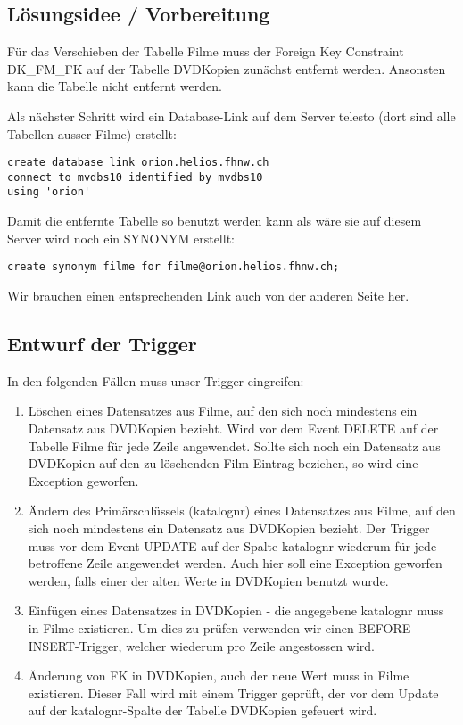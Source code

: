 \documentclass[11pt,a4paper,parskip=half]{scrartcl}
\begin{document}
\subsection{Lösungsidee / Vorbereitung}
Für das Verschieben der Tabelle \glqq{}Filme\grqq{} muss der Foreign Key Constraint \glqq{}DK\_FM\_FK\grqq{} auf der Tabelle \glqq{}DVDKopien\grqq{} zunächst entfernt werden. Ansonsten kann die Tabelle nicht entfernt werden.

Als nächster Schritt wird ein Database-Link auf dem Server telesto (dort sind alle Tabellen ausser Filme) erstellt:

\begin{lstlisting}
create database link orion.helios.fhnw.ch
connect to mvdbs10 identified by mvdbs10
using 'orion'
\end{lstlisting}

Damit die entfernte Tabelle so benutzt werden kann als wäre sie auf diesem Server wird noch ein SYNONYM erstellt:
\begin{lstlisting}
create synonym filme for filme@orion.helios.fhnw.ch;
\end{lstlisting}

Wir brauchen einen entsprechenden Link auch von der anderen Seite her.

\subsection{Entwurf der Trigger}
In den folgenden Fällen muss unser Trigger eingreifen:
\begin{enumerate}
	\item{Löschen eines Datensatzes aus Filme, auf den sich noch mindestens ein Datensatz aus DVDKopien bezieht. Wird vor dem Event DELETE auf der Tabelle Filme für jede Zeile angewendet. Sollte sich noch ein Datensatz aus DVDKopien auf den zu löschenden Film-Eintrag beziehen, so wird eine Exception geworfen.}
	\item{Ändern des Primärschlüssels (katalognr) eines Datensatzes aus Filme, auf den sich noch mindestens ein Datensatz aus DVDKopien bezieht. Der Trigger muss vor dem Event UPDATE auf der Spalte katalognr wiederum für jede betroffene Zeile angewendet werden. Auch hier soll eine Exception geworfen werden, falls einer der alten Werte in DVDKopien benutzt wurde.}
	\item{Einfügen eines Datensatzes in DVDKopien - die angegebene katalognr muss in Filme existieren. Um dies zu prüfen verwenden wir einen BEFORE INSERT-Trigger, welcher wiederum pro Zeile angestossen wird.}
	\item{Änderung von FK in DVDKopien, auch der neue Wert muss in Filme existieren. Dieser Fall wird mit einem Trigger geprüft, der vor dem Update auf der katalognr-Spalte der Tabelle DVDKopien gefeuert wird.}
\end{enumerate}
\end{document}
